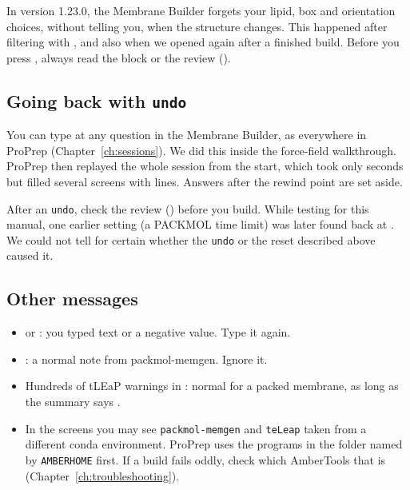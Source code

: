 \begin{watchout}
In version 1.23.0, the Membrane Builder forgets your lipid, box and
orientation choices, without telling you, when the structure changes. This
happened after filtering with , and also when we opened  again
after a finished build. Before you press , always read the
 block or the review ().
\end{watchout}

\subsection{Going back with \texttt{undo}}

You can type  at any question in the Membrane Builder, as
everywhere in ProPrep (Chapter~\ref{ch:sessions}). We did this inside the
force-field walkthrough. ProPrep then replayed the whole session from the
start, which took only seconds but filled several screens with
\prompt{[REPLAY: ...]} lines. Answers after the rewind point are set aside.

\begin{watchout}
After an \texttt{undo}, check the review () before you build. While
testing for this manual, one earlier setting (a PACKMOL time limit) was later
found back at . We could not tell for certain whether the
\texttt{undo} or the reset described above caused it.
\end{watchout}

\subsection{Other messages}

\begin{itemize}
  \item {} or : you typed text or a negative value. Type it again.
  \item {}: a normal
        note from packmol-memgen. Ignore it.
  \item Hundreds of tLEaP warnings in : normal for a packed membrane,
        as long as the summary says .
  \item In the screens you may see \texttt{packmol-memgen} and
        \texttt{teLeap} taken from a different conda environment. ProPrep
        uses the programs in the folder named by \texttt{AMBERHOME} first. If
        a build fails oddly, check which AmberTools that is
        (Chapter~\ref{ch:troubleshooting}).
\end{itemize}
